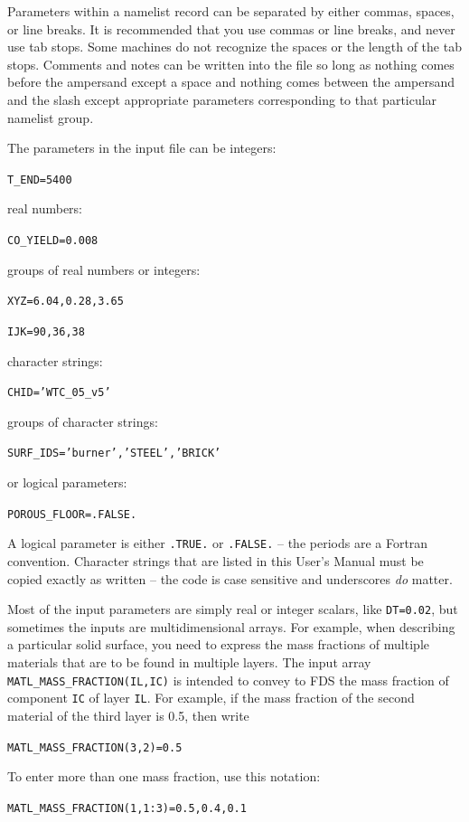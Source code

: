 \documentclass[11pt]{book}
\newcommand{\ct}{\tt\small}
\begin{document}
Parameters within a namelist record can be separated by either commas, spaces, or line breaks. It is recommended that you use
commas or line breaks, and never use tab stops. Some machines do not recognize the spaces or the length of the tab stops.
Comments and notes can be written into the file so long as nothing comes
before the ampersand except a space and nothing comes between the ampersand
and the slash except appropriate parameters corresponding
to that particular namelist group.

\noindent
The parameters in the input file can be integers:

{\ct T\_END=5400}

\noindent
real numbers:

{\ct CO\_YIELD=0.008}

\noindent
groups of real numbers or integers:

{\ct XYZ=6.04,0.28,3.65}

{\ct IJK=90,36,38}

\noindent
character strings:

{\ct CHID='WTC\_05\_v5'}

\noindent
groups of character strings:

{\ct SURF\_IDS='burner','STEEL','BRICK'}

\noindent
or logical parameters:

{\ct POROUS\_FLOOR=.FALSE.}

\noindent
A logical parameter is either
{\ct .TRUE.} or {\ct .FALSE.} -- the periods are a
Fortran convention. Character strings that are listed in
this User's Manual must be copied exactly as written -- the code
is case sensitive and underscores {\em do} matter.

Most of the input parameters are simply real or integer scalars, like {\ct DT=0.02}, but sometimes the inputs are
multidimensional arrays. For example, when describing a particular solid surface, you need to express the mass
fractions of multiple materials that are to be found in multiple layers. The input array {\ct MATL\_MASS\_FRACTION(IL,IC)} is
intended to convey to FDS the mass fraction of component {\ct IC} of layer {\ct IL}. For example, if the mass fraction of the
second material of the third layer is 0.5, then write

{\ct MATL\_MASS\_FRACTION(3,2)=0.5}

\noindent
To enter more than one mass fraction, use
this notation:

{\ct MATL\_MASS\_FRACTION(1,1:3)=0.5,0.4,0.1}
\end{document}
